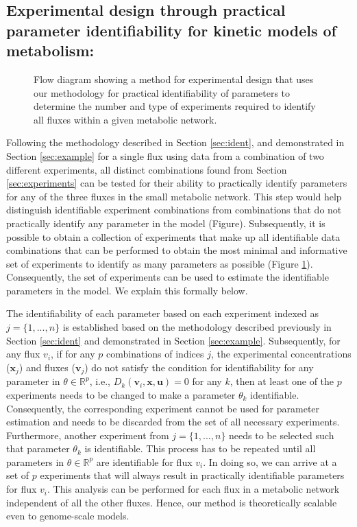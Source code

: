 \documentclass[10pt]{article}
\begin{document}
\subsection{Experimental design through practical parameter identifiability for kinetic models of metabolism:}\label{sec:experimental_design}
\begin{figure}[!tbhp]
	\caption{Flow diagram showing a method for experimental design that uses our methodology for practical identifiability of parameters to determine the number and type of experiments required to identify all fluxes within a given metabolic network.}\label{fig:ident-design}
\end{figure}
Following the methodology described in Section \ref{sec:ident}, and demonstrated in Section \ref{sec:example} for a single flux using data from a combination of two different experiments, all distinct combinations found from Section \ref{sec:experiments} can be tested for their ability to practically identify parameters for any of the three fluxes in the small metabolic network. This step would help distinguish identifiable experiment combinations from combinations that do not practically identify any parameter in the model (Figure).
Subsequently, it is possible to obtain a collection of experiments that make up all identifiable data combinations that can be performed to obtain the most minimal and informative set of experiments to identify as many parameters as possible (Figure \ref{fig:ident-design}). Consequently, the set of experiments can be used to estimate the identifiable parameters in the model. We explain this formally below.

The identifiability of each parameter based on each experiment indexed as $j = \{1, ..., n\}$ is established based on the methodology described previously in Section \ref{sec:ident} and demonstrated in Section \ref{sec:example}. Subsequently, for any flux $v_i$, if for any $p$ combinations of indices $j$, the experimental concentrations ($\mathbf{x}_j$) and fluxes ($\mathbf{v}_j$) do not satisfy the condition for identifiability for any parameter in $\theta\in\mathbb{R}^p$, i.e., $D_k(\mathbf{v}_i, \mathbf{x}, \mathbf{u}) = 0$ for any $k$, then at least one of the $p$ experiments needs to be changed to make a parameter $\theta_k$ identifiable. Consequently, the corresponding experiment cannot be used for parameter estimation and needs to be discarded from the set of all necessary experiments. Furthermore, another experiment from $j = \{1, ..., n\}$ needs to be selected such that parameter $\theta_k$ is identifiable. This process has to be repeated until all parameters in $\theta\in\mathbb{R}^p$ are identifiable for flux $v_i$. In doing so, we can arrive at a set of $p$ experiments that will always result in practically identifiable parameters for flux $v_i$. This analysis can be performed for each flux in a metabolic network independent of all the other fluxes. Hence, our method is theoretically scalable even to genome-scale models. 
\end{document}
